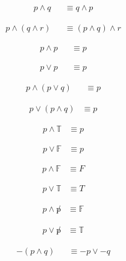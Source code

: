 \begin{align}
  p \land q & 
    & \equiv q \land p
  \label{eq:Commut}
\end{align}

\begin{align}
  p \land (q \land r) &
    & \equiv (p \land q) \land r
  \label{eq:Assoc}
\end{align}

\begin{align}
  p \land p &
    & \equiv p
  \label{eq:Idemp}
\end{align}

\begin{align}
  p \lor p &
    & \equiv p
  \label{eq:Idemp2}
\end{align}

\begin{align}
  p \land (p \lor q) &
    & \equiv p
  \label{eq:Distrib}
\end{align}

\begin{align}
  p \lor (p \land q) & \equiv p
  \label{eq:Distrib2}
\end{align}

\begin{align}
  p \land \mathbb{T} & \equiv p
  \label{eq:IdentAND}
\end{align}

\begin{align}
  p \lor \mathbb{F} & \equiv p
  \label{eq:IdentOR}
\end{align}

\begin{align}
  p \land \mathbb{F} & \equiv F
  \label{eq:Annihil}
\end{align}

\begin{align}
  p \lor \mathbb{T} & \equiv T
  \label{eq:Annihil2}
\end{align}

\begin{align}
  p \land \not p & \equiv \mathbb{F}
  \label{eq:Inv1}
\end{align}

\begin{align}
  p \lor \not p & \equiv \mathbb{T}
  \label{eq:Inv2}
\end{align}

\begin{align}
  -(p \land q) &
    & \equiv -p \lor -q
  \label{eq:deMorgan}
\end{align}

